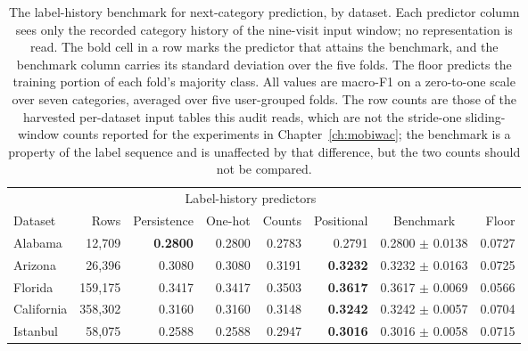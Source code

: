 \begin{table}[htbp]
\caption{The label-history benchmark for next-category prediction, by dataset. Each predictor
column sees only the recorded category history of the nine-visit input window; no representation is
read. The bold cell in a row marks the predictor that attains the benchmark, and the benchmark
column carries its standard deviation over the five folds. The floor predicts the training portion
of each fold's majority class. All values are macro-F1 on a zero-to-one scale over seven
categories, averaged over five user-grouped folds. The row counts are those of the harvested
per-dataset input tables this audit reads, which are not the stride-one sliding-window counts
reported for the experiments in Chapter~\ref{ch:mobiwac}; the benchmark is a property of the label
sequence and is unaffected by that difference, but the two counts should not be compared.}
\label{tab:apx:ceiling}
\centering
\footnotesize
\begin{tabular}{lrrrrrcr}
\toprule
 & & \multicolumn{4}{c}{Label-history predictors} & & \\
\cmidrule(lr){3-6}
Dataset & Rows & Persistence & One-hot & Counts & Positional & Benchmark & Floor \\
\midrule
Alabama & 12,709 & \textbf{0.2800} & 0.2800 & 0.2783 & 0.2791 & 0.2800 $\pm$ 0.0138 & 0.0727 \\
Arizona & 26,396 & 0.3080 & 0.3080 & 0.3191 & \textbf{0.3232} & 0.3232 $\pm$ 0.0163 & 0.0725 \\
Florida & 159,175 & 0.3417 & 0.3417 & 0.3503 & \textbf{0.3617} & 0.3617 $\pm$ 0.0069 & 0.0566 \\
California & 358,302 & 0.3160 & 0.3160 & 0.3148 & \textbf{0.3242} & 0.3242 $\pm$ 0.0057 & 0.0704 \\
Istanbul & 58,075 & 0.2588 & 0.2588 & 0.2947 & \textbf{0.3016} & 0.3016 $\pm$ 0.0058 & 0.0715 \\
\bottomrule
\end{tabular}
\end{table}
